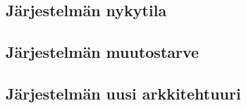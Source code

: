 
\subsection{Järjestelmän nykytila}

\subsection{Järjestelmän muutostarve}

\subsection{Järjestelmän uusi arkkitehtuuri}
